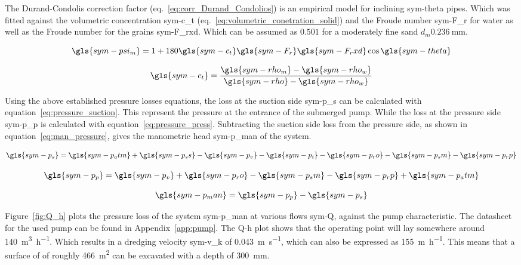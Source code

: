 \noindent The Durand-Condolis correction factor (eq.~\ref{eq:corr_Durand_Condolios}) is an empirical model for inclining
\gls{sym-theta} pipes. Which was fitted against the volumetric concentration \gls{sym-c_t}
(eq.~\ref{eq:volumetric_conetration_solid}) and the Froude number \gls{sym-F_r} for water as well as the Froude number
for the grains \gls{sym-F_rxd}. Which can be assumed as \( 0.501 \) for a moderately fine sand \(d_m
\SI{0.236}{\milli\meter} \).

\begin{equation}
    \label{eq:corr_Durand_Condolios}
    \gls{sym-psi_m} = 1 + 180 \gls{sym-c_t} \gls{sym-F_r} \gls{sym-F_rxd} \cos \gls{sym-theta}
\end{equation}

\begin{equation}
    \label{eq:volumetric_conetration_solid}
    \gls{sym-c_t} = \frac{\gls{sym-rho_m} - \gls{sym-rho_w}}{\gls{sym-rho} - \gls{sym-rho_w}}
\end{equation}

Using the above established pressure losses equations, the loss at the suction side \gls{sym-p_s} can be calculated with
equation~\ref{eq:pressure_suction}. This represent the pressure at the entrance of the submerged pump. While the loss at
the pressure side \gls{sym-p_p} is calculated with equation~\ref{eq:pressure_press}. Subtracting the suction side loss
from the pressure side, as shown in equation~\ref{eq:man_pressure}, gives the manometric head \gls{sym-p_man} of the
system.

\begin{equation}
    \label{eq:pressure_suction}
    \gls{sym-p_s} = \gls{sym-p_atm} + \gls{sym-p_ss} - \gls{sym-p_v} - \gls{sym-p_i} - \gls{sym-p_ro} - 
	\gls{sym-p_sm} - \gls{sym-p_rp}
\end{equation}

\begin{equation}
    \label{eq:pressure_press}
    \gls{sym-p_p} = \gls{sym-p_v} + \gls{sym-p_ro} - \gls{sym-p_sm} - \gls{sym-p_rp} + \gls{sym-p_atm}
\end{equation}

\begin{equation}
    \label{eq:man_pressure}
    \gls{sym-p_man} = \gls{sym-p_p} - \gls{sym-p_s}
\end{equation}

Figure~\ref{fig:Q_h} plots the pressure loss of the system \gls{sym-p_man} at various flows \gls{sym-Q}, against the
pump characteristic. The datasheet for the used pump can be found in Appendix~\ref{app:pump}. The Q-h plot shows that
the operating point will lay somewhere around \SI{140}{\cubic\meter\per\hour}. Which results in a dredging velocity
\gls{sym-v_k} of \SI{0.043}{\meter\per\second}, which can also be expressed as \SI{155}{\meter\per\hour}. This means
that a surface of of roughly \SI{466}{\meter\squared} can be excavated with a depth of \SI{300}{\milli\meter}.

